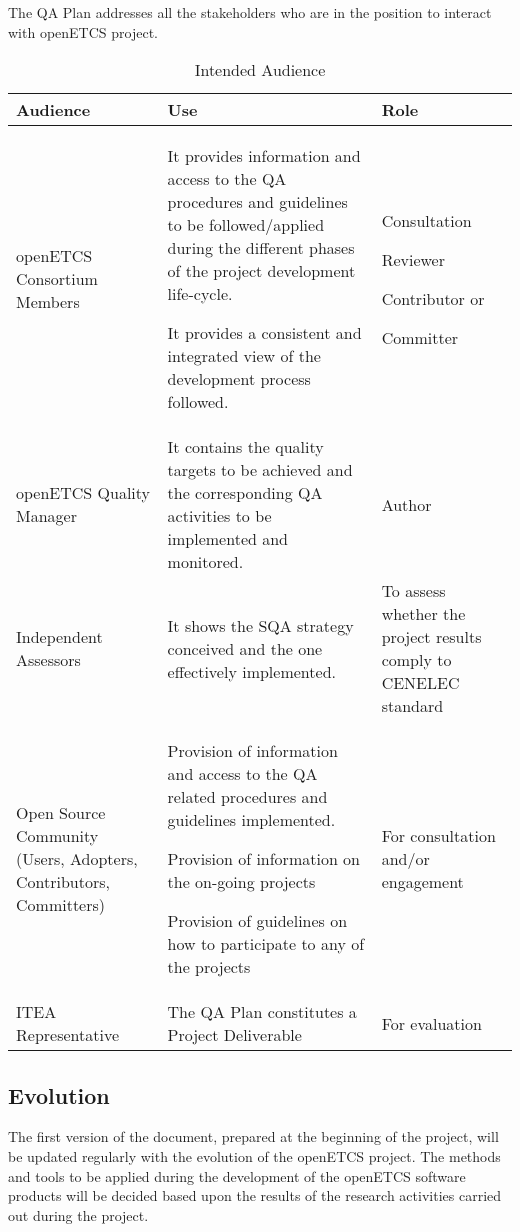 \documentclass{template/openetcs_article}
\begin{document}
The QA Plan addresses all the stakeholders who are in the position to interact with openETCS project.


\begin{table} [H]
\begin{tabular}{|m{3cm}|m{9cm}|m{3cm}|}
\hline
\rowcolor{myblue}
Audience &
Use &
Role\\\hline
openETCS Consortium Members &
It provides information and access to the QA procedures and guidelines to be followed/applied during the different phases of the project development life-cycle.

It provides a consistent and integrated view of the development process followed.
&
Consultation

Reviewer

Contributor or 

Committer
\\\hline
openETCS Quality Manager &
It contains the quality targets to be achieved and the corresponding QA activities to be implemented and monitored. &
Author\\\hline
Independent Assessors &
It shows the SQA strategy conceived and the one effectively implemented. &
To assess whether the project results comply to CENELEC standard\\\hline
Open Source Community (Users, Adopters, Contributors, Committers) &
Provision of information and access to the QA related procedures and guidelines implemented.

Provision of information on the on-going projects

Provision of guidelines on how to participate to any of the projects
&
For consultation and/or engagement\\\hline
ITEA Representative &
The QA Plan constitutes a Project Deliverable &
For evaluation \\\hline
\end{tabular}
\caption{Intended Audience}
\end{table}


\subsection{Evolution}

The first version of the document, prepared at the beginning of the project, will be updated regularly with the evolution of the openETCS project. The methods and tools to be applied during the development of the openETCS software products will be decided based upon the results of the research activities carried out during the project. 
\end{document}
